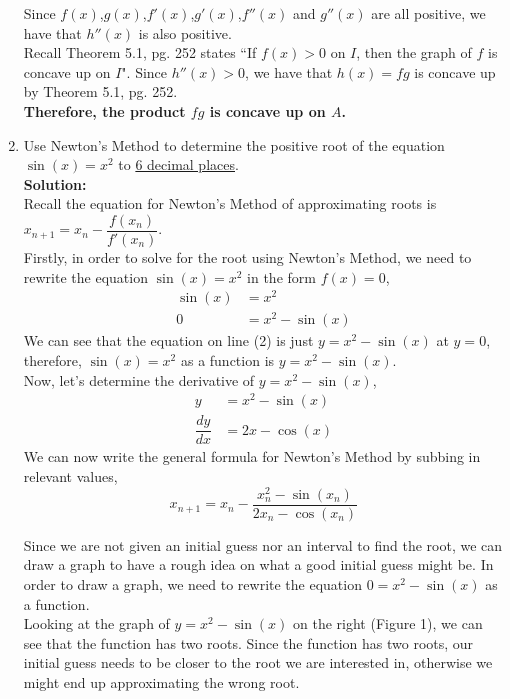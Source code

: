 \documentclass[12pt]{book}
\begin{document}
\begin{enumerate}
Since $f(x)$,$g(x)$,$f'(x)$,$g'(x)$,$f''(x)$ and $g''(x)$ are all positive, we have that $h''(x)$ is also positive.\\

Recall Theorem 5.1, pg. 252 states ``If $f(x) > 0$ on $I$, then the graph of $f$ is concave up on $I$". Since $h''(x) > 0$, we have that $h(x) = fg$ is concave up by Theorem 5.1, pg. 252.\\

\textbf{Therefore, the product $fg$ is concave up on $A$.}




\newpage

\item Use Newton's Method to determine the positive root of the equation $\sin(x)=x^2$ to \underline{6 decimal places}.\\

\textbf{Solution:}\\
\setcounter{equation}{0}
\setcounter{figure}{0}
Recall the equation for Newton's Method of approximating roots is $x_{n+1} = x_n - \dfrac{f(x_n)}{f'(x_n)}$.\\

Firstly, in order to solve for the root using Newton's Method, we need to rewrite the equation $\sin(x)=x^2$ in the form $f(x)=0$,
\begin{align}
    \sin(x) &= x^2 \\
    0 &= x^2-\sin(x)
\end{align}
We can see that the equation on line (2) is just $y=x^2-\sin(x)$ at $y=0$, therefore, $\sin(x)=x^2$ as a function is $y=x^2-\sin(x)$.\\

Now, let's determine the derivative of $y = x^2-\sin(x)$,
\begin{align}
    y &= x^2-\sin(x) \\
    \dfrac{dy}{dx} &= 2x - \cos(x)
\end{align}
We can now write the general formula for Newton's Method by subbing in relevant values,
$$x_{n+1} = x_n - \dfrac{x_n^2-\sin(x_n)}{2x_n - \cos(x_n)}$$
\begin{minipage}{0.5\textwidth}
    Since we are not given an initial guess nor an interval to find the root, we can draw a graph to have a rough idea on what a good initial guess might be. In order to draw a graph, we need to rewrite the equation $0 = x^2-\sin(x)$ as a function.\\
    
    Looking at the graph of $y=x^2-\sin(x)$ on the right (Figure 1), we can see that the function has two roots. Since the function has two roots, our initial guess needs to be closer to the root we are interested in, otherwise we might end up approximating the wrong root.\\
    

\end{minipage}
\end{enumerate}
\end{document}
